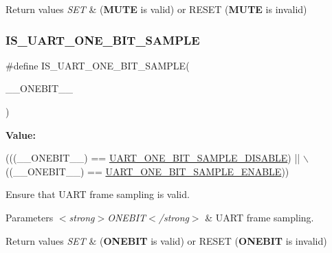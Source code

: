 \begin{DoxyRetVals}{Return values}
{\em S\+ET} & ({\bfseries M\+U\+TE} is valid) or R\+E\+S\+ET ({\bfseries M\+U\+TE} is invalid) \\
\hline
\end{DoxyRetVals}
\mbox{\label{group___u_a_r_t___private___macros_ga6452a4420dac4abd4f0ea0e1677f37a9}} 
\subsubsection{\texorpdfstring{I\+S\+\_\+\+U\+A\+R\+T\+\_\+\+O\+N\+E\+\_\+\+B\+I\+T\+\_\+\+S\+A\+M\+P\+LE}{IS\_UART\_ONE\_BIT\_SAMPLE}}
{\footnotesize\ttfamily \#define I\+S\+\_\+\+U\+A\+R\+T\+\_\+\+O\+N\+E\+\_\+\+B\+I\+T\+\_\+\+S\+A\+M\+P\+LE(\begin{DoxyParamCaption}\item[{}]{\+\_\+\+\_\+\+O\+N\+E\+B\+I\+T\+\_\+\+\_\+ }\end{DoxyParamCaption})}

{\bfseries Value\+:}
\begin{DoxyCode}
(((\_\_ONEBIT\_\_) == \hyperlink{group___u_a_r_t___one_bit___sampling_gadfcb0e9db2719321048b249b2c5cc15f}{UART\_ONE\_BIT\_SAMPLE\_DISABLE}) || \(\backslash\)
                                            ((\_\_ONEBIT\_\_) == 
      \hyperlink{group___u_a_r_t___one_bit___sampling_gadcc0aed6e7a466da3c45363f69dcbfb6}{UART\_ONE\_BIT\_SAMPLE\_ENABLE}))
\end{DoxyCode}


Ensure that U\+A\+RT frame sampling is valid. 


\begin{DoxyParams}{Parameters}
{\em $<$strong$>$\+O\+N\+E\+B\+I\+T$<$/strong$>$} & U\+A\+RT frame sampling. \\
\hline
\end{DoxyParams}

\begin{DoxyRetVals}{Return values}
{\em S\+ET} & ({\bfseries O\+N\+E\+B\+IT} is valid) or R\+E\+S\+ET ({\bfseries O\+N\+E\+B\+IT} is invalid) \\
\hline
\end{DoxyRetVals}
\mbox{\label{group___u_a_r_t___private___macros_ga57b4229ecb4387a0bb9137fed8de13b8}} 
